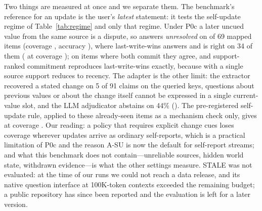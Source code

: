 Two things are measured at once and we separate them. The benchmark's reference for an update is the user's \emph{latest} statement: it tests the self-update regime of Table~\ref{tab:regime} and only that regime. Under P0c a later uncued value from the same source is a dispute, so \pal{} answers \emph{unresolved} on \lmePalUnres{} of 69 mapped items (coverage \lmePalCov, accuracy \lmePalAcc), where last-write-wins answers and is right on 34 of them (\lmeTdbAcc{} at coverage \lmeTdbCov); on items where both commit they agree, and support-ranked commitment reproduces last-write-wins exactly, because with a single source support reduces to recency. The adapter is the other limit: the extractor recovered a stated change on 5 of 91 claims on the queried keys, questions about previous values or about the change itself cannot be expressed in a single current-value slot, and the LLM adjudicator abstains on 44\% (\lmeLogAcc). The pre-registered self-update rule, applied to these already-seen items as a mechanism check only, gives \lmePalSuAcc{} at coverage \lmePalSuCov. Our reading: a policy that requires explicit change cues loses coverage wherever updates arrive as ordinary self-reports, which is a practical limitation of P0c and the reason A-SU is now the default for self-report streams; and what this benchmark does not contain---unreliable sources, hidden world state, withdrawn evidence---is what the other settings measure. STALE \citep{stale2026} was not evaluated: at the time of our runs we could not reach a data release, and its native question interface at 100K-token contexts exceeded the remaining budget; a public repository has since been reported and the evaluation is left for a later version.

